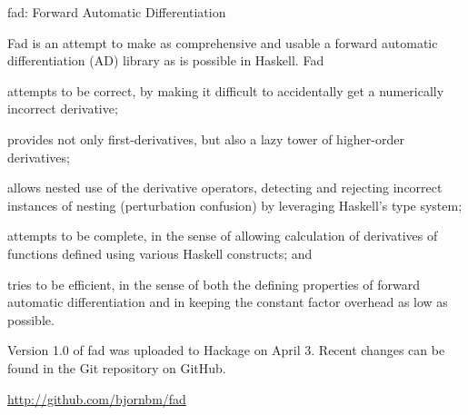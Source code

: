 \documentclass{article}
\begin{document}
\begin{hcarentry}{fad: Forward Automatic Differentiation}
\makeheader


Fad is an attempt to make as comprehensive and usable a forward
automatic differentiation (AD) library as is possible in Haskell.  Fad
\begin{inparaenum}[(a)]
\item attempts to be correct, by making it difficult to accidentally
  get a numerically incorrect derivative;
\item provides not only first-derivatives, but also a lazy tower of
  higher-order derivatives;
\item allows nested use of the derivative operators, detecting and
  rejecting incorrect instances of nesting (perturbation confusion) by
  leveraging Haskell's type system;
\item attempts to be complete, in the sense of allowing calculation of
  derivatives of functions defined using various Haskell constructs;
  and
\item tries to be efficient, in the sense of both the defining
  properties of forward automatic differentiation and in keeping the
  constant factor overhead as low as possible.
\end{inparaenum}


Version 1.0 of fad was uploaded to Hackage on April 3. Recent changes
can be found in the Git repository on GitHub.



\FurtherReading
  \url{http://github.com/bjornbm/fad}
\end{hcarentry}
\end{document}
